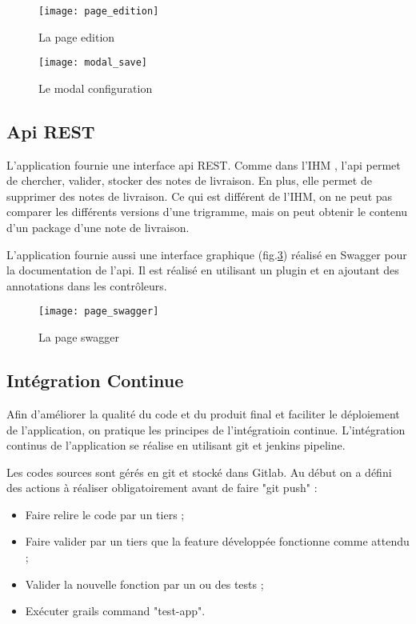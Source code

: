 \begin{figure}[ht]
 \centering
 \texttt{[image: page\_edition]}
 \caption{La page edition}
 \label{fig:page_edition}
\end{figure}

\begin{figure}[ht]
 \centering
 \texttt{[image: modal\_save]}
 \caption{Le modal configuration}
 \label{fig:modal_save}
\end{figure}

\subsection{Api REST}
L'application fournie une interface api REST.
Comme dans l'IHM , l'api permet de chercher, valider, stocker des notes de livraison.
En plus, elle permet de supprimer des notes de livraison.
Ce qui est différent de l'IHM, on ne peut pas comparer les différents versions d'une trigramme, mais on peut obtenir le contenu d'un package d'une note de livraison.

L'application fournie aussi une interface graphique (fig.\ref{fig:page_swagger}) réalisé en Swagger pour la documentation de l'api.
Il est réalisé en utilisant un plugin et en ajoutant des annotations dans les contrôleurs.

\begin{figure}[ht]
 \centering
 \texttt{[image: page\_swagger]}
 \caption{La page swagger}
 \label{fig:page_swagger}
\end{figure}

\subsection{Intégration Continue}
Afin d'améliorer la qualité du code et du produit final et faciliter le déploiement de l'application, on pratique les principes de l'intégratioin continue.
L'intégration continus de l'application se réalise en utilisant git et jenkins pipeline.

Les codes sources sont gérés en git et stocké dans Gitlab.
Au début on a défini des actions à réaliser obligatoirement avant de faire "git push" :
\begin{itemize}
 \item Faire relire le code par un tiers ;
 \item Faire valider par un tiers que la feature développée fonctionne comme attendu ;
 \item Valider la nouvelle fonction par un ou des tests ;
 \item Exécuter grails command "test-app".
\end{itemize}

